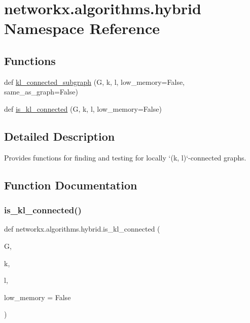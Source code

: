 \hypertarget{namespacenetworkx_1_1algorithms_1_1hybrid}{}\section{networkx.\+algorithms.\+hybrid Namespace Reference}
\label{namespacenetworkx_1_1algorithms_1_1hybrid}
\subsection*{Functions}
\begin{DoxyCompactItemize}
\item 
def \hyperlink{namespacenetworkx_1_1algorithms_1_1hybrid_a60a2f68aaa5743b5c042b8b038b716df}{kl\+\_\+connected\+\_\+subgraph} (G, k, l, low\+\_\+memory=False, same\+\_\+as\+\_\+graph=False)
\item 
def \hyperlink{namespacenetworkx_1_1algorithms_1_1hybrid_a813d117e8f8d65dacb939e3a1bbaf411}{is\+\_\+kl\+\_\+connected} (G, k, l, low\+\_\+memory=False)
\end{DoxyCompactItemize}


\subsection{Detailed Description}
\begin{DoxyVerb}Provides functions for finding and testing for locally `(k, l)`-connected
graphs.\end{DoxyVerb}
 

\subsection{Function Documentation}
\mbox{\label{namespacenetworkx_1_1algorithms_1_1hybrid_a813d117e8f8d65dacb939e3a1bbaf411}} 
\subsubsection{\texorpdfstring{is\+\_\+kl\+\_\+connected()}{is\_kl\_connected()}}
{\footnotesize\ttfamily def networkx.\+algorithms.\+hybrid.\+is\+\_\+kl\+\_\+connected (\begin{DoxyParamCaption}\item[{}]{G,  }\item[{}]{k,  }\item[{}]{l,  }\item[{}]{low\+\_\+memory = {\ttfamily False} }\end{DoxyParamCaption})}

